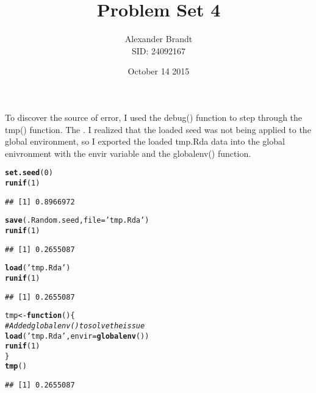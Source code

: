 \documentclass{article}\usepackage[]{graphicx}\usepackage[]{color}
\title{Problem Set 4}
\author{Alexander Brandt\\SID: 24092167}
\date{October 14 2015}
\makeatletter
\newcommand{\hlnum}[1]{\textcolor[rgb]{0.686,0.059,0.569}{#1}}%
\newcommand{\hlstr}[1]{\textcolor[rgb]{0.192,0.494,0.8}{#1}}%
\newcommand{\hlcom}[1]{\textcolor[rgb]{0.678,0.584,0.686}{\textit{#1}}}%
\newcommand{\hlstd}[1]{\textcolor[rgb]{0.345,0.345,0.345}{#1}}%
\newcommand{\hlkwa}[1]{\textcolor[rgb]{0.161,0.373,0.58}{\textbf{#1}}}%
\newcommand{\hlkwb}[1]{\textcolor[rgb]{0.69,0.353,0.396}{#1}}%
\newcommand{\hlkwc}[1]{\textcolor[rgb]{0.333,0.667,0.333}{#1}}%
\newcommand{\hlkwd}[1]{\textcolor[rgb]{0.737,0.353,0.396}{\textbf{#1}}}%
\newenvironment{kframe}{%
 \def\at@end@of@kframe{}%
 \ifinner\ifhmode%
  \def\at@end@of@kframe{\end{minipage}}%
  \begin{minipage}{\columnwidth}%
 \fi\fi%
 \def\FrameCommand##1{\hskip\@totalleftmargin \hskip-\fboxsep
 \colorbox{shadecolor}{##1}\hskip-\fboxsep
     \hskip-\linewidth \hskip-\@totalleftmargin \hskip\columnwidth}%
 \MakeFramed {\advance\hsize-\width
   \@totalleftmargin\z@ \linewidth\hsize
   \@setminipage}}%
 {\par\unskip\endMakeFramed%
 \at@end@of@kframe}
\newenvironment{knitrout}{}{} %
\makeatother
\begin{document}
\maketitle

\section{}

To discover the source of error, I used the debug() function to step through the tmp() function.  The .  I realized that the loaded seed was not being applied to the global environment, so I exported the loaded tmp.Rda data into the global enivronment with the envir variable and the globalenv() function.

\begin{knitrout}
\color{fgcolor}\begin{kframe}
\begin{alltt}
\hlkwd{set.seed}\hlstd{(}\hlnum{0}\hlstd{)}
\hlkwd{runif}\hlstd{(}\hlnum{1}\hlstd{)}
\end{alltt}
\begin{verbatim}
## [1] 0.8966972
\end{verbatim}
\begin{alltt}
\hlkwd{save}\hlstd{(.Random.seed,} \hlkwc{file} \hlstd{=} \hlstr{'tmp.Rda'}\hlstd{)}
\hlkwd{runif}\hlstd{(}\hlnum{1}\hlstd{)}
\end{alltt}
\begin{verbatim}
## [1] 0.2655087
\end{verbatim}
\begin{alltt}
\hlkwd{load}\hlstd{(}\hlstr{'tmp.Rda'}\hlstd{)}
\hlkwd{runif}\hlstd{(}\hlnum{1}\hlstd{)}
\end{alltt}
\begin{verbatim}
## [1] 0.2655087
\end{verbatim}
\begin{alltt}
\hlstd{tmp} \hlkwb{<-} \hlkwa{function}\hlstd{() \{}
  \hlcom{# Added globalenv() to solve the issue}
  \hlkwd{load}\hlstd{(}\hlstr{'tmp.Rda'}\hlstd{,}\hlkwc{envir} \hlstd{=} \hlkwd{globalenv}\hlstd{())}
  \hlkwd{runif}\hlstd{(}\hlnum{1}\hlstd{)}
\hlstd{\}}
\hlkwd{tmp}\hlstd{()}
\end{alltt}
\begin{verbatim}
## [1] 0.2655087
\end{verbatim}
\end{kframe}
\end{knitrout}
\end{document}
